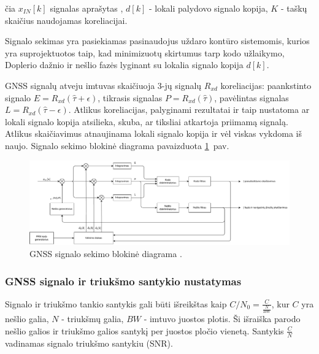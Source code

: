 \documentclass[main.tex]{subfiles}
\begin{document}
\noindent čia $x_{IN}[k]$ signalas aprašytas , $d[k]$ - lokali palydovo
signalo kopija, $K$ - taškų skaičius naudojamas koreliacijai.

Signalo sekimas yra pasiekiamas pasinaudojus uždaro kontūro sistemomis,
kurios yra su\-pro\-jek\-tuo\-tos taip, kad minimizuotų skirtumus tarp kodo užlaikymo,
Doplerio dažnio ir nešlio fazės lyginant su lokalia signalo kopija $d[k]$.

GNSS signalų atveju imtuvas skaičiuoja 3-jų signalų $R_{xd}$ koreliacijas:
paankstinto signalo $E=R_{xd}(\hat{\tau} + \epsilon)$,
tikrasis signalas $P=R_{xd}(\hat{\tau})$,
pavėlintas signalas $L=R_{xd}(\hat{\tau} - \epsilon)$.
Atlikus koreliacijas, palyginami rezultatai ir taip nustatoma
ar lokali signalo kopija atsilieka, skuba, ar tiksliai atkartoja
priimamą signalą. Atlikus skaičiavimus atnaujinama lokali signalo kopija
ir vėl viskas vykdoma iš naujo. Signalo sekimo blokinė diagrama pavaizduota
\ref{fig:gnss_sdr_tracking_block}~pav.

\begin{figure}[h]
    \begin{centering}
    \includegraphics[scale=0.5]{drawings/tracking_diagram}
    \par\end{centering}
    \protect\caption{\label{fig:gnss_sdr_tracking_block}GNSS signalo sekimo blokinė diagrama \cite{gnss_sdr_web}.}
\end{figure}

\subsubsection{GNSS signalo ir triukšmo santykio nustatymas}\label{sec:gnss_snr}

Signalo ir triukšmo tankio santykis gali būti išreikštas kaip $C/N_0 = \frac{C}{\frac{N}{BW}}$,
kur $C$ yra nešlio galia, $N$ - triukšmų galia, $BW$ - imtuvo juostos plotis.
Ši išraiška parodo nešlio galios ir triukšmo galios santykį per juostos pločio vienetą.
Santykis $\frac{C}{N}$ vadinamas signalo triukšmo santykiu (SNR).
\end{document}
